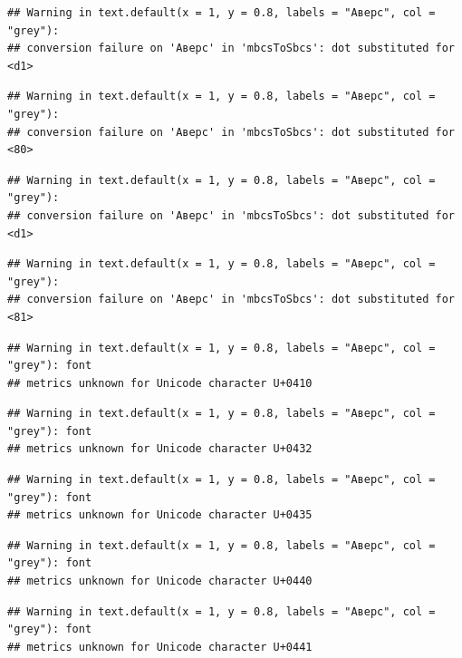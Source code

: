 \documentclass[
  11pt,
]{book}
\begin{document}
\begin{verbatim}
## Warning in text.default(x = 1, y = 0.8, labels = "Аверс", col = "grey"):
## conversion failure on 'Аверс' in 'mbcsToSbcs': dot substituted for <d1>
\end{verbatim}

\begin{verbatim}
## Warning in text.default(x = 1, y = 0.8, labels = "Аверс", col = "grey"):
## conversion failure on 'Аверс' in 'mbcsToSbcs': dot substituted for <80>
\end{verbatim}

\begin{verbatim}
## Warning in text.default(x = 1, y = 0.8, labels = "Аверс", col = "grey"):
## conversion failure on 'Аверс' in 'mbcsToSbcs': dot substituted for <d1>
\end{verbatim}

\begin{verbatim}
## Warning in text.default(x = 1, y = 0.8, labels = "Аверс", col = "grey"):
## conversion failure on 'Аверс' in 'mbcsToSbcs': dot substituted for <81>
\end{verbatim}

\begin{verbatim}
## Warning in text.default(x = 1, y = 0.8, labels = "Аверс", col = "grey"): font
## metrics unknown for Unicode character U+0410
\end{verbatim}

\begin{verbatim}
## Warning in text.default(x = 1, y = 0.8, labels = "Аверс", col = "grey"): font
## metrics unknown for Unicode character U+0432
\end{verbatim}

\begin{verbatim}
## Warning in text.default(x = 1, y = 0.8, labels = "Аверс", col = "grey"): font
## metrics unknown for Unicode character U+0435
\end{verbatim}

\begin{verbatim}
## Warning in text.default(x = 1, y = 0.8, labels = "Аверс", col = "grey"): font
## metrics unknown for Unicode character U+0440
\end{verbatim}

\begin{verbatim}
## Warning in text.default(x = 1, y = 0.8, labels = "Аверс", col = "grey"): font
## metrics unknown for Unicode character U+0441
\end{verbatim}
\end{document}
